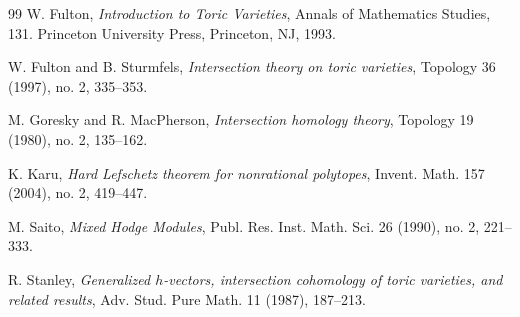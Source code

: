 \documentclass[12pt,reqno]{amsart}
\theoremstyle{plain}
\theoremstyle{definition}
\begin{document}
\begin{thebibliography}{99}
		W. Fulton,
		\textit{Introduction to Toric Varieties},
		Annals of Mathematics Studies, 131. Princeton University Press, Princeton, NJ, 1993.
		
		W. Fulton and B. Sturmfels,
		\textit{Intersection theory on toric varieties},
		Topology 36 (1997), no. 2, 335--353.
		
		M. Goresky and R. MacPherson,
		\textit{Intersection homology theory},
		Topology 19 (1980), no. 2, 135--162.
		
		K. Karu,
		\textit{Hard Lefschetz theorem for nonrational polytopes},
		Invent. Math. 157 (2004), no. 2, 419--447.
		
		M. Saito,
		\textit{Mixed Hodge Modules},
		Publ. Res. Inst. Math. Sci. 26 (1990), no. 2, 221--333.
		
		R. Stanley,
		\textit{Generalized $h$-vectors, intersection cohomology of toric varieties, and related results},
		Adv. Stud. Pure Math. 11 (1987), 187--213.
		
	\end{thebibliography}
	
\end{document}
